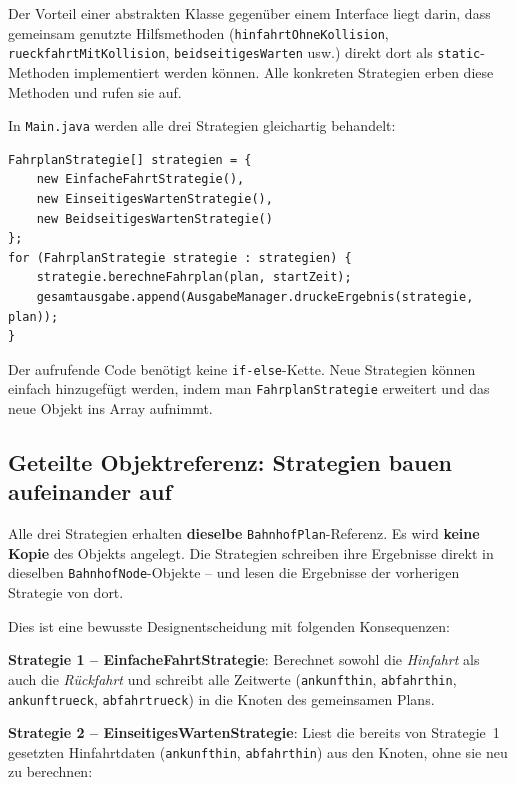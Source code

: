 \documentclass[12pt,a4paper]{article}
\begin{document}
Der Vorteil einer abstrakten Klasse gegenüber einem Interface liegt darin, dass gemeinsam genutzte Hilfsmethoden (\texttt{hinfahrtOhneKollision}, \texttt{rueckfahrtMitKollision}, \texttt{beidseitigesWarten} usw.) direkt dort als \texttt{static}-Methoden implementiert werden können. Alle konkreten Strategien erben diese Methoden und rufen sie auf.

In \texttt{Main.java} werden alle drei Strategien gleichartig behandelt:

\begin{lstlisting}[caption={Verwendung des Strategy Patterns in Main}]
FahrplanStrategie[] strategien = {
    new EinfacheFahrtStrategie(),
    new EinseitigesWartenStrategie(),
    new BeidseitigesWartenStrategie()
};
for (FahrplanStrategie strategie : strategien) {
    strategie.berechneFahrplan(plan, startZeit);
    gesamtausgabe.append(AusgabeManager.druckeErgebnis(strategie, plan));
}
\end{lstlisting}

Der aufrufende Code benötigt keine \texttt{if-else}-Kette. Neue Strategien können einfach hinzugefügt werden, indem man \texttt{FahrplanStrategie} erweitert und das neue Objekt ins Array aufnimmt.

\subsection{Geteilte Objektreferenz: Strategien bauen aufeinander auf}
\label{sec:referenz}

\begin{designbox}
Alle drei Strategien erhalten \textbf{dieselbe} \texttt{BahnhofPlan}-Referenz. Es wird \textbf{keine Kopie} des Objekts angelegt. Die Strategien schreiben ihre Ergebnisse direkt in dieselben \texttt{BahnhofNode}-Objekte -- und lesen die Ergebnisse der vorherigen Strategie von dort.
\end{designbox}

Dies ist eine bewusste Designentscheidung mit folgenden Konsequenzen:

\textbf{Strategie 1 -- EinfacheFahrtStrategie}:
Berechnet sowohl die \emph{Hinfahrt} als auch die \emph{Rückfahrt} und schreibt alle Zeitwerte (\texttt{ankunfthin}, \texttt{abfahrthin}, \texttt{ankunftrueck}, \texttt{abfahrtrueck}) in die Knoten des gemeinsamen Plans.

\textbf{Strategie 2 -- EinseitigesWartenStrategie}:
Liest die bereits von Strategie~1 gesetzten Hinfahrtdaten (\texttt{ankunfthin}, \texttt{abfahrthin}) aus den Knoten, ohne sie neu zu berechnen:
\end{document}
